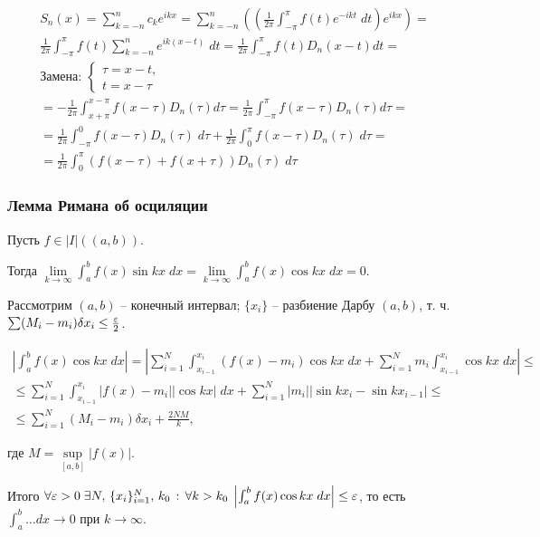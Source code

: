 \begin{gather*}
    S_n(x) = \sum_{k=-n}^{n} c_k e^{ikx} =\sum_{k=-n}^{n} \left(\left(\frac{1}{2\pi} \int_{-\pi}^\pi f(t) e^{-ikt}\;dt\right) e^{ikx}\right) = \\
    \frac{1}{2\pi} \int_{-\pi}^\pi f(t) \sum_{k=-n}^n e^{ik(x-t)}\;dt = \frac{1}{2\pi} \int_{-\pi}^\pi f(t) D_n(x-t) dt = \\
    \text{Замена: }\begin{cases}\tau = x-t, \\ t = x-\tau \end{cases} \\
    = - \frac{1}{2\pi} \int_{x+\pi}^{x-\pi} f(x-\tau) D_n(\tau) d\tau = \frac{1}{2\pi} \int_{-\pi}^\pi f(x-\tau) D_n(\tau) d\tau = \\
    = \frac{1}{2\pi} \int_{-\pi}^0 f(x-\tau) D_n(\tau) \;d\tau + \frac{1}{2\pi} \int_0^{\pi} f(x-\tau) D_n(\tau) \;d\tau = \\
    = \frac{1}{2\pi} \int_0^\pi \left(f(x-\tau) + f(x+\tau)\right) D_n(\tau) \;d\tau
\end{gather*}

\subsubsection{Лемма Римана об осциляции}

Пусть $f \in |I|((a, b))$.

Тогда $\lim\limits_{k \to \infty} \int_a^b f(x) \sin kx \; dx = \lim\limits_{k \to \infty} \int_a^b f(x) \cos kx \;dx = 0$.

\Proof

Рассмотрим $(a, b)$ -- конечный интервал; $\{x_i\}$ -- разбиение Дарбу $(a, b)$, т. ч. $\sum (M_i - m_i) \delta x_i \leq \frac{\varepsilon}{2}$.

\begin{gather*}
    \left|\int_a^b f(x) \cos kx \;dx\right| = \left|\sum_{i=1}^N \int_{x_{i-1}}^{x_i} (f(x) - m_i) \cos kx \;dx + \sum_{i=1}^N m_i \int_{x_{i-1}}^{x_i} \cos kx \;dx\right| \leq \\
    \leq \sum_{i=1}^N \int_{x_{i-1}}^{x_i} |f(x) - m_i| |\cos kx| \;dx + \sum_{i=1}^N |m_i| |\sin kx_i - \sin kx_{i-1}| \leq \\
    \leq \sum_{i=1}^N (M_i - m_i) \delta x_i + \frac{2NM}{k},
\end{gather*}

где $M = \sup\limits_{[a, b]} |f(x)|$.

Итого $\forall \varepsilon > 0 \; \exists N, \, \{x_i\}_{i=1}^N, \, k_0 \,:\, \forall k > k_0 \; \left|\int_a^b f(x) \cos kx \;dx\right| \leq \varepsilon$, то есть $\int_a^b \dots dx \to 0$ при $k \to \infty$.

